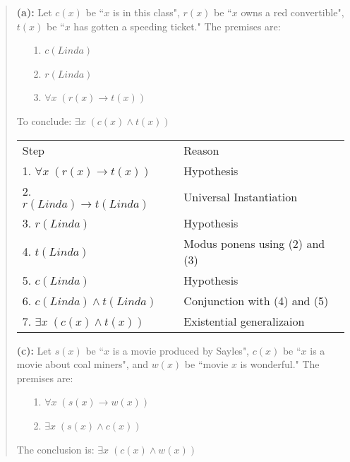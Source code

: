 \documentclass[12pt,addpoints]{exam}
\begin{document}
\begin{questions}
\begin{solution}
\begin{quote}
    \textbf{(a):} Let $c(x)$ be ``$x$ is in this class", $r(x)$ be ``$x$ owns a red convertible", $t(x)$ be ``$x$ has gotten a speeding ticket."  The premises are:
    \begin{itemize}
        \item[1.] $c(Linda)$
        \item[2.] $r(Linda)$
        \item[3.] $\forall x\; (r(x) \rightarrow t(x))$
    \end{itemize}
    To conclude: $\exists x\; (c(x) \wedge t(x))$

    \smallskip
    \begin{tabular}{lll}
        Step        & \hspace{0.2in} & Reason \\
        1. $\forall x\; (r(x) \rightarrow t(x))$    &   & Hypothesis \\
        2. $r(Linda) \rightarrow t(Linda)$          &   & Universal Instantiation \\
        3. $r(Linda)$                               &   & Hypothesis \\
        4. $t(Linda)$                               &   & Modus ponens using (2) and (3) \\
        5. $c(Linda)$                               &   & Hypothesis \\
        6. $c(Linda) \wedge t(Linda)$               &   & Conjunction with (4) and (5) \\
        7. $\exists x\; (c(x) \wedge t(x))$         &   & Existential generalizaion \\
    \end{tabular}

    \medskip
    \textbf{(c):} Let $s(x)$ be ``$x$ is a movie produced by Sayles", $c(x)$ be ``$x$ is a movie about coal miners", and $w(x)$ be ``movie $x$ is wonderful."  The premises are:
    \begin{itemize}
        \item[1.] $\forall x\; (s(x) \rightarrow w(x))$
        \item[2.] $\exists x\; (s(x) \wedge c(x))$
    \end{itemize}
    The conclusion is: $\exists x\; (c(x) \wedge w(x))$


\end{quote}
\end{solution}
\end{questions}
\end{document}
